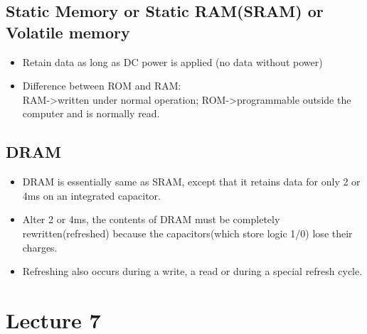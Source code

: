 \documentclass[12pt]{article}
\begin{document}
\subsection{Static Memory or Static RAM(SRAM) or Volatile memory}

\begin{itemize}
	\item Retain data as long as DC power is applied (no data without power)
	
	\item Difference between ROM and RAM:\\
	RAM->written under normal operation;
	ROM->programmable outside the computer and is normally read.
\end{itemize}

\subsection{DRAM}
\begin{itemize}
	\item DRAM is essentially same as SRAM, except that it retains data for only 2 or 4ms on an integrated capacitor.
	
	\item Alter 2 or 4ms, the contents of DRAM must be completely rewritten(refreshed) because the capacitors(which store logic 1/0) lose their charges.
	
	\item Refreshing also occurs during a write, a read or during a special refresh cycle.
\end{itemize}

\newpage

\section{Lecture 7}
\end{document}
